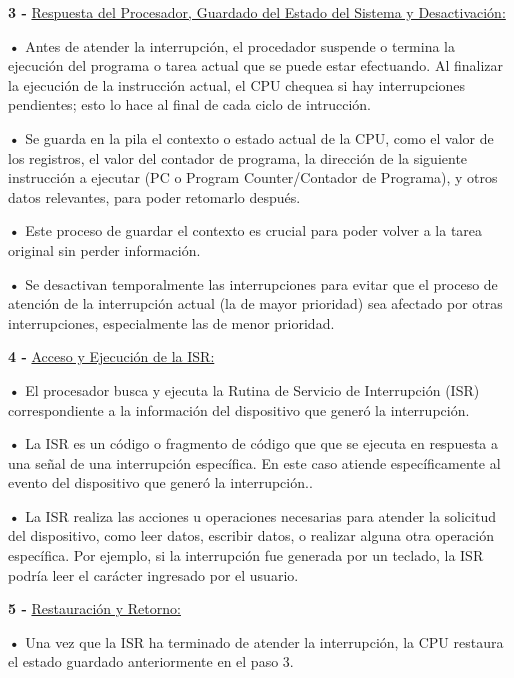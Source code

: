 \documentclass{article}
\begin{document}
\textbf{3 -  } {\underline{ Respuesta del Procesador, Guardado del Estado del Sistema y Desactivación: }}

\quad

\textbf{    •} { Antes de atender la interrupción, el procedador suspende o termina la ejecución del programa o tarea actual que se puede estar efectuando. Al finalizar la ejecución de la instrucción actual, el CPU chequea si hay interrupciones pendientes; esto lo hace al final de cada ciclo de intrucción.}

\textbf{    •} { Se guarda en la pila el contexto o estado actual de la CPU, como el valor de los registros, el valor del contador de programa, la dirección de la siguiente instrucción a ejecutar (PC o Program Counter/Contador de Programa), y otros datos relevantes, para poder retomarlo después.}


\textbf{    •} { Este proceso de guardar el contexto es crucial para poder volver a la tarea original sin perder información.}


\textbf{    •} { Se desactivan temporalmente las interrupciones para evitar que el proceso de atención de la interrupción actual (la de mayor prioridad) sea afectado por otras interrupciones, especialmente las de menor prioridad.}

\quad

\textbf{4 -  } {\underline{ Acceso y Ejecución de la ISR: }}

\quad

\textbf{    •} { El procesador busca y ejecuta la Rutina de Servicio de Interrupción (ISR) correspondiente a la información del dispositivo que generó la interrupción.}

\textbf{    •} { La ISR es un código o fragmento de código que que se ejecuta en respuesta a una señal de una interrupción específica. En este caso atiende específicamente al evento del dispositivo que generó la interrupción..}

\textbf{    •} { La ISR realiza las acciones u operaciones necesarias para atender la solicitud del dispositivo, como leer datos, escribir datos, o realizar alguna otra operación específica. Por ejemplo, si la interrupción fue generada por un teclado, la ISR podría leer el carácter ingresado por el usuario.}

\quad

\textbf{5 -  } {\underline{ Restauración y Retorno: }}

\quad

\textbf{    •} { Una vez que la ISR ha terminado de atender la interrupción, la CPU restaura el estado guardado anteriormente en el paso 3.}
\end{document}
